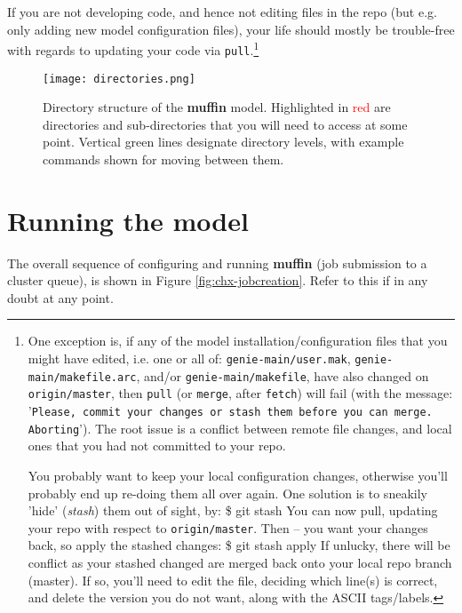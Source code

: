 \documentclass[11pt,fleqn]{book} %
\begin{document}
If you are not developing code, and hence not editing files in the repo (but e.g. only adding new model configuration files), your life should mostly be trouble-free with regards to updating your code via \texttt{pull}.\footnote{
One exception is, if any of the model installation/configuration files that you might have edited, i.e. one or all of: \texttt{genie-main/user.mak}, \texttt{genie-main/makefile.arc}, and/or \texttt{genie-main/makefile}, have also changed on \texttt{origin/master}, then \texttt{pull} (or \texttt{merge}, after \texttt{fetch}) will fail (with the message: '\texttt{Please, commit your changes or stash them before you can merge. Aborting}'). The root issue is a conflict between remote file changes, and local ones that you had not committed to your repo.

You probably want to keep your local configuration changes, otherwise you'll probably end up re-doing them all over again. One solution is to sneakily 'hide' (\textit{stash}) them out of sight, by:
\$ git stash
\noindent You can now pull, updating your repo with respect to \texttt{origin/master}. Then -- you want your changes back, so apply the stashed changes:
\$ git stash apply
If unlucky, there will be conflict as your stashed changed are merged back onto your local repo branch (master). If so, you'll need to edit the file, deciding which line(s) is correct, and delete the version you do not want, along with the ASCII tags/labels.
}


\begin{figure}
\texttt{[image: directories.png]}
\caption{Directory structure of the \textbf{muffin} model. Highlighted in \textcolor{red}{red} are directories and sub-directories that you will need to access at some point. Vertical \textcolor[rgb]{0,0.501961,0}{green} lines designate directory levels, with example commands shown for moving between them.}
\label{fig:directories}
\end{figure}


\newpage


\section{Running the model}

The overall sequence of configuring and running \textbf{muffin} (job submission to a cluster queue), is shown in Figure \ref{fig:chx-jobcreation}. Refer to this if in any doubt at any point.
\end{document}
